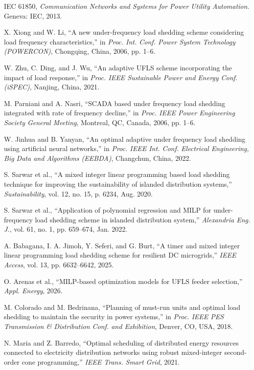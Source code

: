IEC 61850, \emph{Communication Networks and Systems for Power Utility Automation}. Geneva: IEC, 2013.

X. Xiong and W. Li, ``A new under-frequency load shedding scheme considering load frequency characteristics,'' in \emph{Proc. Int. Conf. Power System Technology (POWERCON)}, Chongqing, China, 2006, pp. 1--6.

W. Zhu, C. Ding, and J. Wu, ``An adaptive UFLS scheme incorporating the impact of load response,'' in \emph{Proc. IEEE Sustainable Power and Energy Conf. (iSPEC)}, Nanjing, China, 2021.

M. Parniani and A. Nasri, ``SCADA based under frequency load shedding integrated with rate of frequency decline,'' in \emph{Proc. IEEE Power Engineering Society General Meeting}, Montreal, QC, Canada, 2006, pp. 1--6.

W. Jinhua and B. Yanyan, ``An optimal adaptive under frequency load shedding using artificial neural networks,'' in \emph{Proc. IEEE Int. Conf. Electrical Engineering, Big Data and Algorithms (EEBDA)}, Changchun, China, 2022.

S. Sarwar et al., ``A mixed integer linear programming based load shedding technique for improving the sustainability of islanded distribution systems,'' \emph{Sustainability}, vol. 12, no. 15, p. 6234, Aug. 2020.

S. Sarwar et al., ``Application of polynomial regression and MILP for under-frequency load shedding scheme in islanded distribution system,'' \emph{Alexandria Eng. J.}, vol. 61, no. 1, pp. 659--674, Jan. 2022.

A. Babagana, I. A. Jimoh, Y. Seferi, and G. Burt, ``A timer and mixed integer linear programming load shedding scheme for resilient DC microgrids,'' \emph{IEEE Access}, vol. 13, pp. 6632--6642, 2025.

O. Arenas et al., ``MILP-based optimization models for UFLS feeder selection,'' \emph{Appl. Energy}, 2026.

M. Colorado and M. Bedrinana, ``Planning of must-run units and optimal load shedding to maintain the security in power systems,'' in \emph{Proc. IEEE PES Transmission \& Distribution Conf. and Exhibition}, Denver, CO, USA, 2018.

N. Maria and Z. Barredo, ``Optimal scheduling of distributed energy resources connected to electricity distribution networks using robust mixed-integer second-order cone programming,'' \emph{IEEE Trans. Smart Grid}, 2021.

